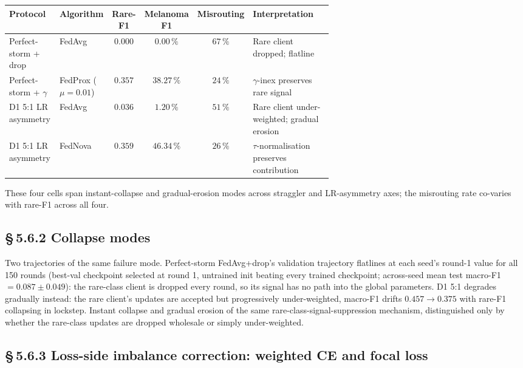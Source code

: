 \documentclass[11pt,a4paper]{report}
\begin{document}
\begin{center}
\small
\begin{tabular}{p{0.16\linewidth} p{0.14\linewidth} c c c p{0.32\linewidth}}
\hline
Protocol                  & Algorithm & Rare-F1 & Melanoma F1 & Misrouting & Interpretation \\
\hline
Perfect-storm + drop      & FedAvg    & $0.000$ & $0.00\,\%$  & $67\,\%$   & Rare client dropped; flatline \\
Perfect-storm + $\gamma$  & FedProx ($\mu=0.01$) & $0.357$ & $38.27\,\%$ & $24\,\%$ & $\gamma$-inex preserves rare signal \\
D1 5:1 LR asymmetry       & FedAvg    & $0.036$ & $1.20\,\%$  & $51\,\%$   & Rare client under-weighted; gradual erosion \\
D1 5:1 LR asymmetry       & FedNova   & $0.359$ & $46.34\,\%$ & $26\,\%$   & $\tau$-normalisation preserves contribution \\
\hline
\end{tabular}
\end{center}

\noindent
These four cells span instant-collapse and gradual-erosion modes across
straggler and LR-asymmetry axes; the misrouting rate co-varies with rare-F1
across all four.


\subsection*{\S\,5.6.2 Collapse modes}

Two trajectories of the same failure mode. Perfect-storm FedAvg+drop's
validation trajectory flatlines at each seed's round-1 value for all 150
rounds (best-val checkpoint selected at round 1, untrained init beating
every trained checkpoint; across-seed mean test macro-F1 $= 0.087 \pm 0.049$):
the rare-class client is dropped every round, so its signal has no path
into the global parameters. D1 5:1 degrades gradually instead: the rare client's updates
are accepted but progressively under-weighted, macro-F1 drifts $0.457 \to
0.375$ with rare-F1 collapsing in lockstep. Instant collapse and gradual
erosion of the same rare-class-signal-suppression mechanism, distinguished
only by whether the rare-class updates are dropped wholesale or simply
under-weighted.


\subsection*{\S\,5.6.3 Loss-side imbalance correction: weighted CE and
focal loss}
\end{document}
